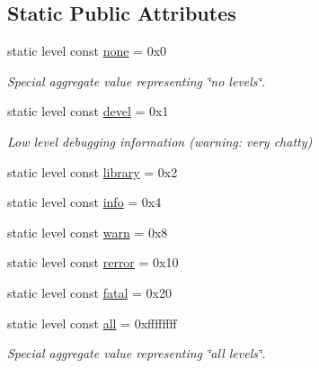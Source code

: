 \subsection*{Static Public Attributes}
\begin{DoxyCompactItemize}
\item 
static level const \hyperlink{structwebsocketpp_1_1log_1_1elevel_ae86395aa26ec2089e07fd63b62a549fa}{none} = 0x0\hypertarget{structwebsocketpp_1_1log_1_1elevel_ae86395aa26ec2089e07fd63b62a549fa}{}\label{structwebsocketpp_1_1log_1_1elevel_ae86395aa26ec2089e07fd63b62a549fa}

\begin{DoxyCompactList}\small\item\em Special aggregate value representing \char`\"{}no levels\char`\"{}. \end{DoxyCompactList}\item 
static level const \hyperlink{structwebsocketpp_1_1log_1_1elevel_a0b1dbc650c6f2711522c096496423726}{devel} = 0x1\hypertarget{structwebsocketpp_1_1log_1_1elevel_a0b1dbc650c6f2711522c096496423726}{}\label{structwebsocketpp_1_1log_1_1elevel_a0b1dbc650c6f2711522c096496423726}

\begin{DoxyCompactList}\small\item\em Low level debugging information (warning\+: very chatty) \end{DoxyCompactList}\item 
static level const \hyperlink{structwebsocketpp_1_1log_1_1elevel_a2b862d4f143d9b77619ddbacd1763674}{library} = 0x2
\item 
static level const \hyperlink{structwebsocketpp_1_1log_1_1elevel_a3ab47987a682f0de7b1d0df8c9c3b9d2}{info} = 0x4
\item 
static level const \hyperlink{structwebsocketpp_1_1log_1_1elevel_aef51fd791400121297f38f4381edaebe}{warn} = 0x8
\item 
static level const \hyperlink{structwebsocketpp_1_1log_1_1elevel_ae8a9a9f8b1fa45a731acd340e10aa342}{rerror} = 0x10
\item 
static level const \hyperlink{structwebsocketpp_1_1log_1_1elevel_aa909808e0fb142742a0ebd2dca54f517}{fatal} = 0x20
\item 
static level const \hyperlink{structwebsocketpp_1_1log_1_1elevel_a9b31ff708c221d314f9f4eb3ff2b1ad7}{all} = 0xffffffff\hypertarget{structwebsocketpp_1_1log_1_1elevel_a9b31ff708c221d314f9f4eb3ff2b1ad7}{}\label{structwebsocketpp_1_1log_1_1elevel_a9b31ff708c221d314f9f4eb3ff2b1ad7}

\begin{DoxyCompactList}\small\item\em Special aggregate value representing \char`\"{}all levels\char`\"{}. \end{DoxyCompactList}\end{DoxyCompactItemize}


